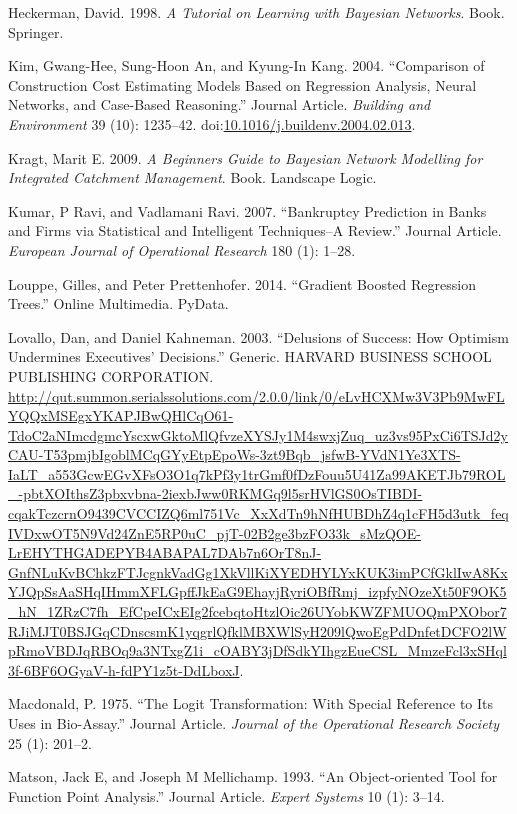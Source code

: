 \documentclass[]{elsarticle} %
\begin{document}
\hypertarget{ref-Heckerman1998}{}
Heckerman, David. 1998. \emph{A Tutorial on Learning with Bayesian
Networks}. Book. Springer.

\hypertarget{ref-Kim2004}{}
Kim, Gwang-Hee, Sung-Hoon An, and Kyung-In Kang. 2004. ``Comparison of
Construction Cost Estimating Models Based on Regression Analysis, Neural
Networks, and Case-Based Reasoning.'' Journal Article. \emph{Building
and Environment} 39 (10): 1235--42.
doi:\href{https://doi.org/10.1016/j.buildenv.2004.02.013}{10.1016/j.buildenv.2004.02.013}.

\hypertarget{ref-Kragt2009}{}
Kragt, Marit E. 2009. \emph{A Beginners Guide to Bayesian Network
Modelling for Integrated Catchment Management}. Book. Landscape Logic.

\hypertarget{ref-Kumar2007}{}
Kumar, P Ravi, and Vadlamani Ravi. 2007. ``Bankruptcy Prediction in
Banks and Firms via Statistical and Intelligent Techniques--A Review.''
Journal Article. \emph{European Journal of Operational Research} 180
(1): 1--28.

\hypertarget{ref-Louppe2014}{}
Louppe, Gilles, and Peter Prettenhofer. 2014. ``Gradient Boosted
Regression Trees.'' Online Multimedia. PyData.

\hypertarget{ref-Lovallo2003}{}
Lovallo, Dan, and Daniel Kahneman. 2003. ``Delusions of Success: How
Optimism Undermines Executives' Decisions.'' Generic. HARVARD BUSINESS
SCHOOL PUBLISHING CORPORATION.
\url{http://qut.summon.serialssolutions.com/2.0.0/link/0/eLvHCXMw3V3Pb9MwFLYQQxMSEgxYKAPJBwQHlCqO61-TdoC2aNImcdgmcYscxwGktoMlQfvzeXYSJy1M4swxjZuq_uz3vs95PxCi6TSJd2yCAU-T53pmjbIgoblMCqGYyEtpEpoWs-3zt9Bqb_jsfwB-YVdN1Ye3XTS-IaLT_a553GcwEGvXFsO3O1q7kPf3y1trGmf0fDzFouu5U41Za99AKETJb79ROL_-pbtXOIthsZ3pbxvbna-2iexbJww0RKMGq9l5srHVlGS0OsTIBDI-cqakTczcrnO9439CVCCIZQ6ml751Vc_XxXdTn9hNfHUBDhZ4q1cFH5d3utk_feqIVDxwOT5N9Vd24ZnE5RP0uC_pjT-02B2ge3bzFO33k_sMzQOE-LrEHYTHGADEPYB4ABAPAL7DAb7n6OrT8nJ-GnfNLuKvBChkzFTJcgnkVadGg1XkVllKiXYEDHYLYxKUK3imPCfGklIwA8KxYJQpSsAaSHqIHmmXFLGpffJkEaG9EhayjRyriOBfRmj_izpfyNOzeXt50F9OK5_hN_1ZRzC7fh_EfCpeICxEIg2fcebqtoHtzlOic26UYobKWZFMUOQmPXObor7RJiMJT0BSJGqCDnscsmK1yqgrlQfklMBXWlSyH209lQwoEgPdDnfetDCFO2lWpRmoVBDJqRBOq9a3NTxgZ1i_cOABY3jDfSdkYIhgzEueCSL_MmzeFcl3xSHql3f-6BF6OGyaV-h-fdPY1z5t-DdLboxJ}.

\hypertarget{ref-Macdonald1975}{}
Macdonald, P. 1975. ``The Logit Transformation: With Special Reference
to Its Uses in Bio-Assay.'' Journal Article. \emph{Journal of the
Operational Research Society} 25 (1): 201--2.

\hypertarget{ref-Matson1993}{}
Matson, Jack E, and Joseph M Mellichamp. 1993. ``An Object‐oriented Tool
for Function Point Analysis.'' Journal Article. \emph{Expert Systems} 10
(1): 3--14.
\end{document}

